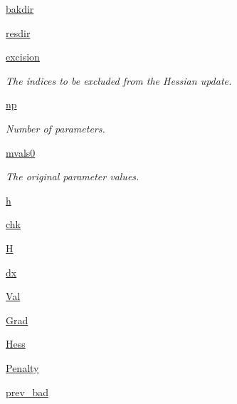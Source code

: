 \begin{DoxyCompactItemize}
\hyperlink{classforcebalance_1_1optimizer_1_1Optimizer_add421251bd6091e20bbb61ce2e101e8a}{bakdir}
\item 
\hyperlink{classforcebalance_1_1optimizer_1_1Optimizer_a5b4723583be79d1387d7d77d07bab150}{resdir}
\item 
\hyperlink{classforcebalance_1_1optimizer_1_1Optimizer_a1040c03a6361d782db8bd6a273d445e5}{excision}
\begin{DoxyCompactList}\small\item\em The indices to be excluded from the Hessian update. \end{DoxyCompactList}\item 
\hyperlink{classforcebalance_1_1optimizer_1_1Optimizer_af198da71b849e8e10611bf16ea5914cf}{np}
\begin{DoxyCompactList}\small\item\em Number of parameters. \end{DoxyCompactList}\item 
\hyperlink{classforcebalance_1_1optimizer_1_1Optimizer_aa1d7f33ea1c9341fb1c867ef01752a16}{mvals0}
\begin{DoxyCompactList}\small\item\em The original parameter values. \end{DoxyCompactList}\item 
\hyperlink{classforcebalance_1_1optimizer_1_1Optimizer_a40d384de05fbd9cf8d64b139ff927641}{h}
\item 
\hyperlink{classforcebalance_1_1optimizer_1_1Optimizer_aab04585adf73123d3187aa7dd22e7ce2}{chk}
\item 
\hyperlink{classforcebalance_1_1optimizer_1_1Optimizer_a7cf404b3b15afec4237344f09a31b6c7}{H}
\item 
\hyperlink{classforcebalance_1_1optimizer_1_1Optimizer_aaa9b39385a4d067aec12a595da09cc16}{dx}
\item 
\hyperlink{classforcebalance_1_1optimizer_1_1Optimizer_a2577b97a9ee5f3fcd4aa108a2baafc04}{Val}
\item 
\hyperlink{classforcebalance_1_1optimizer_1_1Optimizer_a91fbca8385133fa434eae3078e217fb6}{Grad}
\item 
\hyperlink{classforcebalance_1_1optimizer_1_1Optimizer_ab99276420d1c28932d2559c7f8e88922}{Hess}
\item 
\hyperlink{classforcebalance_1_1optimizer_1_1Optimizer_a5dc01aec7e22062a42cc83298c49cadd}{Penalty}
\item 
\hyperlink{classforcebalance_1_1optimizer_1_1Optimizer_adff89109d09abbe1e19923c8f392591a}{prev\-\_\-bad}

\end{DoxyCompactItemize}
